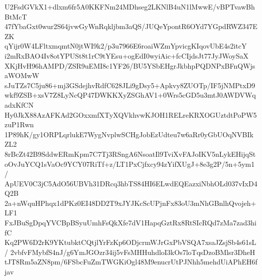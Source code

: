 U2FsdGVkX1+dlxm6fr5A0KKFNm24MDhseg2LKNlB4uN1lMwwE/vBPTvawBhBtMcT
47fYbaGxt0wur2S64jvwGyWnRqkljbm3aQS/JUQeYpontR6OYd7YGpdRWZ347EZK
qYijr0W4LFltxmqmtN0jtWI9k2/p3u7966E6roaiWZmYpvicgKIqovUbE4s2itcY
i2mRxBAO4Iv8otYPUSt8t1rC9tYEsu+ogEdI0wyiAic+fcCIjdsJt77JyJWoySaX
XKjHvH96hAMPD/ZSR9uEMI8c1YF26/BU5YSbEHgrJkbhpPQDNPxBFnQWjsaWOMwW
sJuTZs7C5ju86+mj3GSdejhvRdfC628JLi9gDsy5+Apkvy8ZUOTp/IF5jNMPtxD9
wkf9ZSB+xsV7Z8LyNcQP47DWKKXyZSGhAV1+0Wrs5cGD5u3mtJ0AWDVWqadxKfCN
Hy0JkX88AzAFKAd2GOxxmfXTyXQVkhvwKJOH1RELreKRXOGUztdtPoPW5zuP1Rwn
1P89hK/gy1ORPLqrlukE7WygNvplwSCHgJobEzUdteu7w6aRr0yGbUOqNVBIkZL2
8rBcZt42B9SddwERmKpm7C7Tj3RSngA6NsoatIl9TviXvFAJoIKV5nLykEHijqSt
oOvJuYCQ1sVaOc9YCY07RiTf+z/LT1PxCjfxcy94zYifXUgJ+8e3g2P/5n+5ym1/
ApUEV0C3jC5AdO56UBVh31DRcq3hbTS84HI6ELwdEQEazxiNbhOLd037vIxD4Q2B
2a+nWquHPhqx1dPKz0EI48DD2T9xJYJKcScUPjnFx83oU3mNhGBnlhQvojeh+LF1
FxJBuSgDpqYVCBpBSyuUmhFsQkXfe7dV1HapqGztRx8RtSIcRQd7zMa7zad3hifC
Kq2PW6D2rK9YKtubktCQtjlYrFzKp6ODjcrmWJrGxPbVSQA7xsaJZsjSb4s61sL/
2vbfvFMybfS4nJ/g6YmJGOzr34ij5vFsMHHuhdloI3kOs7loTqsDzoBMlsr3DheH
tJT8Rm5aZN8pm/6FSbcFuZmTWGKiOgl48M9enucrUtPJNhh5mehdUiAPhEH6fjav
